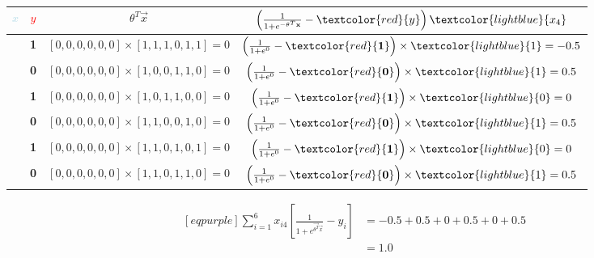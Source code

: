 \begin{table}[H]
	\centering
	\caption{}
	\label{tab:training-4}
	\begin{tabular}{*{4}{|c}|}
		\hline
		\textcolor{lightblue}{$x$} & \textcolor{red}{$y$} & $\theta^{T}\vec{x}$ & $\left( \frac{1}{1 + e^{-\vec{\theta}^{T}\vec{x}} } - \textcolor{red}{y} \right) \textcolor{lightblue}{x_{4}}$\\
		\hline
		[1, 1, 1, 0, 1, 1] & \textbf{1} & $[0, 0, 0, 0, 0, 0] \times [1, 1, 1, 0, 1, 1] = 0$ & $\left( \frac{1}{1 + e^{0}} - \textcolor{red}{\mathbf{1}} \right) \times \textcolor{lightblue}{1} = -0.5$\\
		\hline
		[1, 0, 0, 1, 1, 0] & \textbf{0} & $[0, 0, 0, 0, 0, 0] \times [1, 0, 0, 1, 1, 0] = 0$ & $\left( \frac{1}{1 + e^{0}} - \textcolor{red}{\mathbf{0}} \right) \times \textcolor{lightblue}{1} = 0.5$\\
		\hline
		[1, 0, 1, 1, 0, 0] & \textbf{1} & $[0, 0, 0, 0, 0, 0] \times [1, 0, 1, 1, 0, 0] = 0$ & $\left( \frac{1}{1 + e^{0}} - \textcolor{red}{\mathbf{1}} \right) \times \textcolor{lightblue}{0} = 0$\\
		\hline
		[1, 1, 0, 0, 1, 0] & \textbf{0} & $[0, 0, 0, 0, 0, 0] \times [1, 1, 0, 0, 1, 0] = 0$ & $\left( \frac{1}{1 + e^{0}} - \textcolor{red}{\mathbf{0}} \right) \times \textcolor{lightblue}{1} = 0.5$\\
		\hline
		[1, 1, 0, 1, 0, 1] & \textbf{1} & $[0, 0, 0, 0, 0, 0] \times [1, 1, 0, 1, 0, 1] = 0$ & $\left( \frac{1}{1 + e^{0}} - \textcolor{red}{\mathbf{1}} \right) \times \textcolor{lightblue}{0} = 0$\\
		\hline
		[1, 1, 0, 1, 1, 0] & \textbf{0} & $[0, 0, 0, 0, 0, 0] \times [1, 1, 0, 1, 1, 0] = 0$ & $\left( \frac{1}{1 + e^{0}} - \textcolor{red}{\mathbf{0}} \right) \times \textcolor{lightblue}{1} = 0.5$\\
		\hline
	\end{tabular}
\end{table}
\begin{equation*}
\begin{aligned}[eqpurple]
	\sum_{i=1}^6 x_{i4} \left[ \frac{1}{ 1 + e^{\vec{\theta^{T}}\vec{x}}} - y_{i} \right] &= -0.5 + 0.5 + 0 + 0.5 + 0 + 0.5 \\
&= 1.0
\end{aligned}
\end{equation*}

